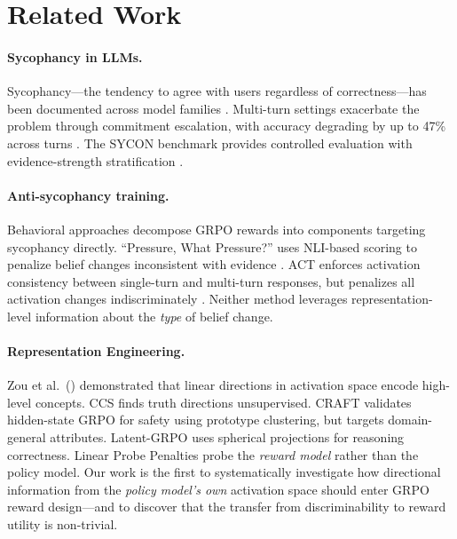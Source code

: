\documentclass[11pt,a4paper]{article}
\begin{document}
\section{Related Work}

\paragraph{Sycophancy in LLMs.} Sycophancy---the tendency to agree with users regardless of correctness---has been documented across model families \cite{perez2023discovering,sharma2024towards,wei2024simple}. Multi-turn settings exacerbate the problem through commitment escalation, with accuracy degrading by up to 47\% across turns \cite{truthdecay2025}. The SYCON benchmark provides controlled evaluation with evidence-strength stratification \cite{sycon2025}.

\paragraph{Anti-sycophancy training.} Behavioral approaches decompose GRPO rewards into components targeting sycophancy directly. ``Pressure, What Pressure?'' uses NLI-based scoring to penalize belief changes inconsistent with evidence \cite{pwwp2025}. ACT enforces activation consistency between single-turn and multi-turn responses, but penalizes all activation changes indiscriminately \cite{act2025}. Neither method leverages representation-level information about the \emph{type} of belief change.

\paragraph{Representation Engineering.} Zou et al.\ (\citeyear{zou2023representation}) demonstrated that linear directions in activation space encode high-level concepts. CCS \cite{burns2023discovering} finds truth directions unsupervised. CRAFT \cite{craft2025} validates hidden-state GRPO for safety using prototype clustering, but targets domain-general attributes. Latent-GRPO \cite{zhang2026latent} uses spherical projections for reasoning correctness. Linear Probe Penalties \cite{lpp2025} probe the \emph{reward model} rather than the policy model. Our work is the first to systematically investigate how directional information from the \emph{policy model's own} activation space should enter GRPO reward design---and to discover that the transfer from discriminability to reward utility is non-trivial.
\end{document}
